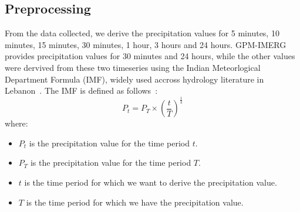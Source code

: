 \subsection{Preprocessing}
From the data collected, we derive the precipitation values for 5 minutes, 10 minutes, 15 minutes, 30 minutes, 1 hour, 3 hours and 24 hours. GPM-IMERG provides precipitation values for 30 minutes and 24 hours, while the other values were dervived from these two timeseries using the Indian Meteorlogical Department Formula (IMF), widely used accross hydrology literature in Lebanon~\cite{}.%
The IMF is defined as follows~\cite{}:
\begin{equation}
P_{t} = P_{T} \times {\left(\frac{t}{T}\right)}^{\frac{1}{3}}
\end{equation}
where:
\begin{itemize}
  \item $P_{t}$ is the precipitation value for the time period $t$.
  \item $P_{T}$ is the precipitation value for the time period $T$.
  \item $t$ is the time period for which we want to derive the precipitation value.
  \item $T$ is the time period for which we have the precipitation value.
\end{itemize}